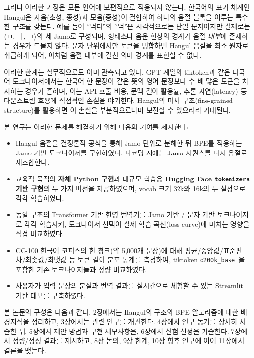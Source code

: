 \documentclass[sigconf,nonacm]{acmart}
\begin{document}
그러나 이러한 가정은 모든 언어에 보편적으로 적용되지 않는다. 한국어의 표기 체계인
Hangul은 자음(초성, 종성)과 모음(중성)이 결합하여 하나의 음절 블록을 이루는 특수한 구조를 갖는다.
예를 들어 ``먹다''의 ``먹''은 시각적으로는 단일 문자이지만 실제로는 $\langle$ㅁ, ㅓ, ㄱ$\rangle$의
세 Jamo로 구성되며, 형태소나 음운 현상의 경계가 음절 \emph{내부}에 존재하는 경우가 드물지 않다.
문자 단위에서만 토큰을 병합하면 Hangul 음절을 최소 원자로 취급하게 되어, 이처럼 음절 내부에 걸친
의미 경계를 표현할 수 없다.

이러한 한계는 실무적으로도 이미 관측되고 있다. GPT 계열의 tiktoken과 같은 다국어 토크나이저에서는
한국어 한 문장이 같은 뜻의 영어 문장보다 수 배 많은 토큰을 차지하는 경우가 흔하며, 이는 API
호출 비용, 문맥 길이 활용률, 추론 지연(latency) 등 다운스트림 효용에 직접적인 손실을 야기한다.
Hangul의 미세 구조(fine-grained structure)를 활용하면 이 손실을 부분적으로나마 보전할 수 있으리라
기대된다.

본 연구는 이러한 문제를 해결하기 위해 다음의 기여를 제시한다:
\begin{itemize}
    \item Hangul 음절을 결정론적 공식을 통해 Jamo 단위로 분해한 뒤 BPE를 적용하는
    Jamo 기반 토크나이저를 구현하였다. 디코딩 시에는 Jamo 시퀀스를 다시 음절로 재조합한다.
    \item 교육적 목적의 \textbf{자체 Python 구현}과 대규모 학습용 \textbf{Hugging Face \texttt{tokenizers}
    기반 구현}의 두 가지 버전을 제공하였으며, vocab 크기 32k와 16k의 두 설정으로 각각 학습하였다.
    \item 동일 구조의 Transformer 기반 한영 번역기를 Jamo 기반 / 문자 기반 토크나이저로 각각 학습시켜,
    토크나이저 선택이 실제 학습 곡선(loss curve)에 미치는 영향을 직접 비교하였다.
    \item CC-100 한국어 코퍼스의 한 청크(약 5,000개 문장)에 대해 평균/중앙값/표준편차/최솟값/최댓값 등
    토큰 길이 분포 통계를 측정하여, tiktoken \texttt{o200k\_base}~\cite{tiktoken}을 포함한 기존
    토크나이저들과 정량 비교하였다.
    \item 사용자가 입력 문장의 분절과 번역 결과를 실시간으로 체험할 수 있는 Streamlit 기반 데모를 구축하였다.
\end{itemize}

본 논문의 구성은 다음과 같다. 2장에서는 Hangul의 구조와 BPE 알고리즘에 대한 배경지식을 정리하고,
3장에서는 관련 연구를 개관한다. 4장에서 연구 동기를 상세히 서술한 뒤, 5장에서 제안 방법과 구현
세부사항을, 6장에서 실험 설정을 기술한다. 7장에서 정량/정성 결과를 제시하고, 8장 논의,
9장 한계, 10장 향후 연구에 이어 11장에서 결론을 맺는다.
\end{document}
